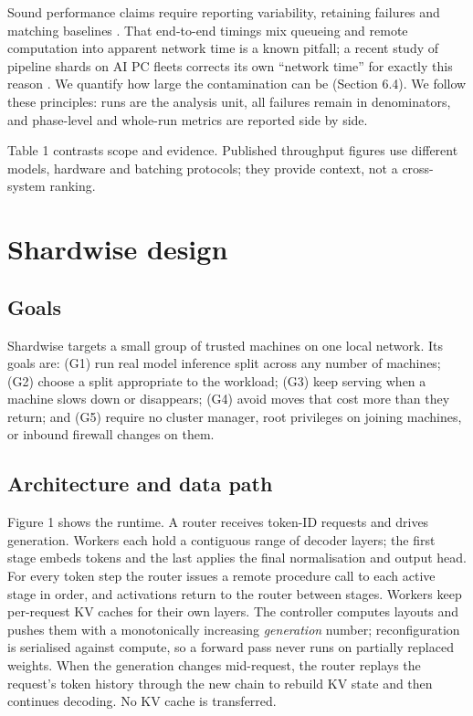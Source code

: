 \documentclass[preprint,12pt]{elsarticle}
\begin{document}
Sound performance claims require reporting variability, retaining
failures and matching baselines
\citep{jain1991art, hoefler2015benchmarking}. That end-to-end timings
mix queueing and remote computation into apparent network time is a
known pitfall; a recent study of pipeline shards on AI PC fleets
corrects its own ``network time'' for exactly this reason
\citep{aipcfleet2026}. We quantify how large the contamination can be
(Section 6.4). We follow these principles: runs are the analysis unit,
all failures remain in denominators, and phase-level and whole-run
metrics are reported side by side.

Table 1 contrasts scope and evidence. Published throughput figures use
different models, hardware and batching protocols; they provide context,
not a cross-system ranking.



\hypertarget{shardwise-design}{%
\section{Shardwise design}\label{shardwise-design}}

\hypertarget{goals}{%
\subsection{Goals}\label{goals}}

Shardwise targets a small group of trusted machines on one local
network. Its goals are: (G1) run real model inference split across any
number of machines; (G2) choose a split appropriate to the workload;
(G3) keep serving when a machine slows down or disappears; (G4) avoid
moves that cost more than they return; and (G5) require no cluster
manager, root privileges on joining machines, or inbound firewall
changes on them.

\hypertarget{architecture-and-data-path}{%
\subsection{Architecture and data
path}\label{architecture-and-data-path}}

Figure 1 shows the runtime. A router receives token-ID requests and
drives generation. Workers each hold a contiguous range of decoder
layers; the first stage embeds tokens and the last applies the final
normalisation and output head. For every token step the router issues a
remote procedure call to each active stage in order, and activations
return to the router between stages. Workers keep per-request KV caches
for their own layers. The controller computes layouts and pushes them
with a monotonically increasing \emph{generation} number;
reconfiguration is serialised against compute, so a forward pass never
runs on partially replaced weights. When the generation changes
mid-request, the router replays the request's token history through the
new chain to rebuild KV state and then continues decoding. No KV cache
is transferred.
\end{document}
